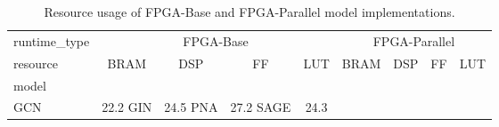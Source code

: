 \begin{table}
\caption{Resource usage of FPGA-Base and FPGA-Parallel model implementations.}
\label{tab:resources}
\begin{tabular}{l|cccc|cccc|}
\toprule
runtime_type & \multicolumn{4}{c|}{FPGA-Base} & \multicolumn{4}{c|}{FPGA-Parallel} \\
resource & BRAM & DSP & FF & LUT & BRAM & DSP & FF & LUT \\
model &  &  &  &  &  &  &  &  \\
\midrule
GCN & 22.2%
GIN & 24.5%
PNA & 27.2%
SAGE & 24.3%
\bottomrule
\end{tabular}
\end{table}
